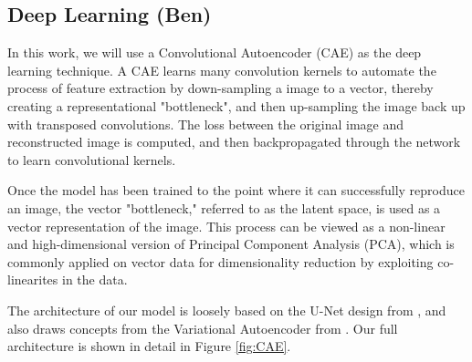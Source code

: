\documentclass[12pt]{article}
\begin{document}
\subsection{Deep Learning (Ben)}
In this work, we will use a Convolutional Autoencoder (CAE) as the deep learning technique. 
A CAE learns many convolution kernels to automate the process of feature extraction by down-sampling a image to a vector, thereby creating a representational "bottleneck", and then up-sampling the image back up with transposed convolutions. 
The loss between the original image and reconstructed image is computed, and then backpropagated through the network to learn convolutional kernels. 

Once the model has been trained to the point where it can successfully reproduce an image, the vector "bottleneck," referred to as the latent space, is used as a vector representation of the image. 
This process can be viewed as a non-linear and high-dimensional version of Principal Component Analysis (PCA), which is commonly applied on vector data for dimensionality reduction by exploiting co-linearites in the data. 

The architecture of our model is loosely based on the U-Net design from \cite{DBLP:journals/corr/RonnebergerFB15}, and also draws concepts from the Variational Autoencoder from \cite{Subramanian2020}. 
Our full architecture is shown in detail in Figure \ref{fig:CAE}.
\end{document}

